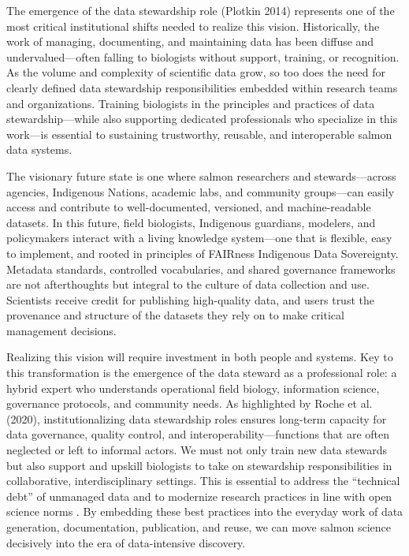 \documentclass[
  letterpaper,
  DIV=11,
  numbers=noendperiod]{scrartcl}
\begin{document}
The emergence of the data stewardship role (Plotkin 2014) represents one
of the most critical institutional shifts needed to realize this vision.
Historically, the work of managing, documenting, and maintaining data
has been diffuse and undervalued---often falling to biologists without
support, training, or recognition. As the volume and complexity of
scientific data grow, so too does the need for clearly defined data
stewardship responsibilities embedded within research teams and
organizations. Training biologists in the principles and practices of
data stewardship---while also supporting dedicated professionals who
specialize in this work---is essential to sustaining trustworthy,
reusable, and interoperable salmon data systems.

The visionary future state is one where salmon researchers and
stewards---across agencies, Indigenous Nations, academic labs, and
community groups---can easily access and contribute to well-documented,
versioned, and machine-readable datasets. In this future, field
biologists, Indigenous guardians, modelers, and policymakers interact
with a living knowledge system---one that is flexible, easy to
implement, and rooted in principles of FAIRness Indigenous Data
Sovereignty. Metadata standards, controlled vocabularies, and shared
governance frameworks are not afterthoughts but integral to the culture
of data collection and use. Scientists receive credit for publishing
high-quality data, and users trust the provenance and structure of the
datasets they rely on to make critical management decisions.

Realizing this vision will require investment in both people and
systems. Key to this transformation is the emergence of the data steward
as a professional role: a hybrid expert who understands operational
field biology, information science, governance protocols, and community
needs. As highlighted by Roche et al. (2020), institutionalizing data
stewardship roles ensures long-term capacity for data governance,
quality control, and interoperability---functions that are often
neglected or left to informal actors. We must not only train new data
stewards but also support and upskill biologists to take on stewardship
responsibilities in collaborative, interdisciplinary settings. This is
essential to address the ``technical debt'' of unmanaged data and to
modernize research practices in line with open science norms . By
embedding these best practices into the everyday work of data
generation, documentation, publication, and reuse, we can move salmon
science decisively into the era of data-intensive discovery.
\end{document}
